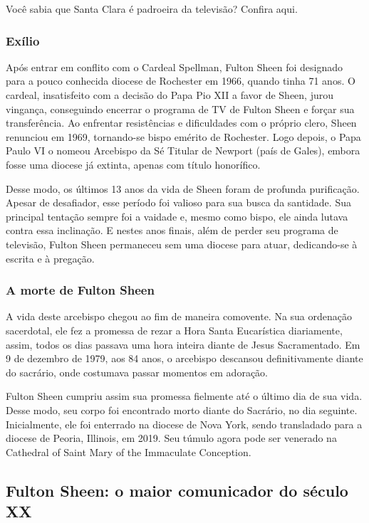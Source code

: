 \documentclass[11pt]{article}
\begin{document}
\begin{justify}
Você sabia que Santa Clara é padroeira da televisão? Confira aqui.

\subsubsection{Exílio}

Após entrar em conflito com o Cardeal Spellman, Fulton Sheen foi designado para a pouco conhecida diocese de Rochester em 1966, quando tinha 71 anos. O cardeal, insatisfeito com a decisão do Papa Pio XII a favor de Sheen, jurou vingança, conseguindo encerrar o programa de TV de Fulton Sheen e forçar sua transferência. Ao enfrentar resistências e dificuldades com o próprio clero, Sheen renunciou em 1969, tornando-se bispo emérito de Rochester. Logo depois, o Papa Paulo VI o nomeou Arcebispo da Sé Titular de Newport (país de Gales), embora fosse uma diocese já extinta, apenas com título honorífico.

Desse modo, os últimos 13 anos da vida de Sheen foram de profunda purificação. Apesar de desafiador, esse período foi valioso para sua busca da santidade. Sua principal tentação sempre foi a vaidade e, mesmo como bispo, ele ainda lutava contra essa inclinação. E nestes anos finais, além de perder seu programa de televisão, Fulton Sheen permaneceu sem uma diocese para atuar, dedicando-se à escrita e à pregação.

\subsubsection{A morte de Fulton Sheen}

A vida deste arcebispo chegou ao fim de maneira comovente. Na sua ordenação sacerdotal, ele fez a promessa de rezar a Hora Santa Eucarística diariamente, assim, todos os dias passava uma hora inteira diante de Jesus Sacramentado. Em 9 de dezembro de 1979, aos 84 anos, o arcebispo descansou definitivamente diante do sacrário, onde costumava passar momentos em adoração.

Fulton Sheen cumpriu assim sua promessa fielmente até o último dia de sua vida. Desse modo, seu corpo foi encontrado morto diante do Sacrário, no dia seguinte. Inicialmente, ele foi enterrado na diocese de Nova York, sendo transladado para a diocese de Peoria, Illinois, em 2019. Seu túmulo agora pode ser venerado na Cathedral of Saint Mary of the Immaculate Conception.

\subsection{Fulton Sheen: o maior comunicador do século XX}


\end{justify}
\end{document}
